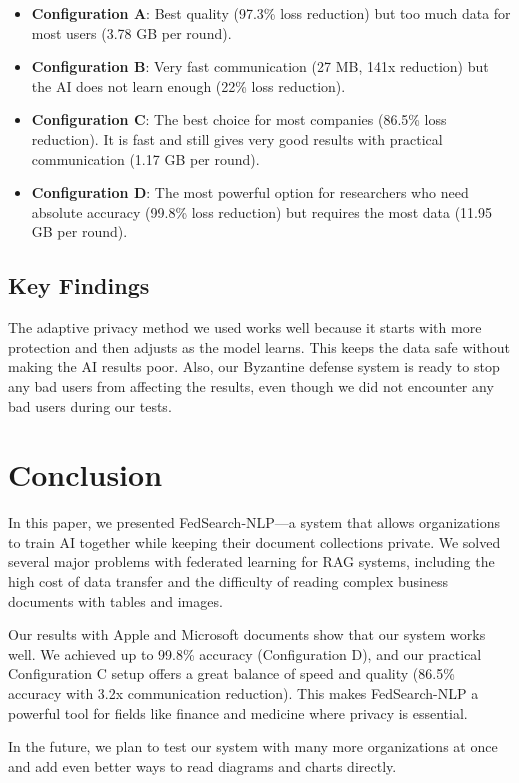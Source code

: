 \documentclass[acmsmall,screen]{acmart}
\begin{document}
\begin{itemize}
    \item \textbf{Configuration A}: Best quality (97.3\% loss reduction) but too much data for most users (3.78 GB per round).
    \item \textbf{Configuration B}: Very fast communication (27 MB, 141x reduction) but the AI does not learn enough (22\% loss reduction).
    \item \textbf{Configuration C}: The best choice for most companies (86.5\% loss reduction). It is fast and still gives very good results with practical communication (1.17 GB per round).
    \item \textbf{Configuration D}: The most powerful option for researchers who need absolute accuracy (99.8\% loss reduction) but requires the most data (11.95 GB per round).
\end{itemize}

\subsection{Key Findings}

The adaptive privacy method we used works well because it starts with more protection and then adjusts as the model learns. This keeps the data safe without making the AI results poor. Also, our Byzantine defense system is ready to stop any bad users from affecting the results, even though we did not encounter any bad users during our tests.

\section{Conclusion}

In this paper, we presented FedSearch-NLP—a system that allows organizations to train AI together while keeping their document collections private. We solved several major problems with federated learning for RAG systems, including the high cost of data transfer and the difficulty of reading complex business documents with tables and images.

Our results with Apple and Microsoft documents show that our system works well. We achieved up to 99.8\% accuracy (Configuration D), and our practical Configuration C setup offers a great balance of speed and quality (86.5\% accuracy with 3.2x communication reduction). This makes FedSearch-NLP a powerful tool for fields like finance and medicine where privacy is essential.

In the future, we plan to test our system with many more organizations at once and add even better ways to read diagrams and charts directly.
\end{document}
